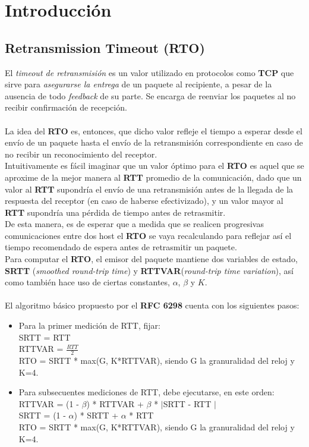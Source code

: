 \section{Introducción}

\subsection{Retransmission Timeout (RTO)}

\indent \indent El \textit{timeout de retransmisión} es un valor utilizado en protocolos 
como \textbf{TCP} que sirve para \textit{asegurarse la entrega} de un paquete al
recipiente, a pesar de la ausencia de todo \textit{feedback} de su parte. Se 
encarga de reenviar los paquetes al no recibir confirmación de recepción.\\
\\
\indent La idea del \textbf{RTO} es, entonces, que dicho valor refleje el tiempo a esperar desde el envío de un paquete hasta el envío de la retransmisión correspondiente en caso de no recibir un reconocimiento del receptor.\\
\indent Intuitivamente es fácil imaginar que un valor óptimo para el \textbf{RTO} es aquel que se aproxime de la mejor manera al \textbf{RTT} promedio de la comunicación, dado que un valor al \textbf{RTT} supondría el envío de una retransmisión antes de la llegada de la respuesta del receptor (en caso de haberse efectivizado), y un valor mayor al \textbf{RTT} supondría una pérdida de tiempo antes de retrasmitir.\\
\indent De esta manera, es de esperar que a medida que se realicen progresivas comunicaciones entre dos host el \textbf{RTO} se vaya recalculando para reflejar así el tiempo recomendado de espera antes de retrasmitir un paquete.\\
\indent Para computar el \textbf{RTO}, el emisor del paquete mantiene dos
variables de estado, \textbf{SRTT} (\textit{smoothed round-trip time}) y \textbf{RTTVAR}(\textit{round-trip time variation}), así como también hace uso de ciertas constantes, $\alpha$, $\beta$ y $K$.\\
\\
\indent El algoritmo básico propuesto por el \textbf{RFC 6298} cuenta con los siguientes pasos:\\
\begin{itemize}
\item Para la primer medición de RTT, fijar:\\
SRTT = RTT\\
RTTVAR = $\frac{RTT}{2}$ \\
RTO = SRTT * max(G, K*RTTVAR), siendo G la granuralidad del reloj y K=4.\\
\item Para subsecuentes mediciones de RTT, debe ejecutarse, en este orden:\\
RTTVAR = (1 - $\beta$) * RTTVAR + $\beta$ * $|$SRTT - RTT $|$\\
SRTT = (1 - $\alpha$) * SRTT + $\alpha$ * RTT\\
RTO = SRTT * max(G, K*RTTVAR), siendo G la granuralidad del reloj y K=4.\\
\end{itemize}

